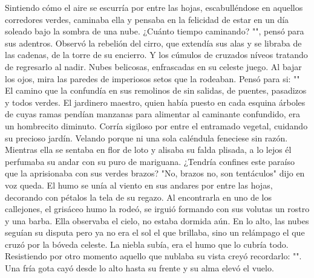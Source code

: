 \markdownRendererInterblockSeparator
{}Sintiendo cómo el aire se escurría por entre las hojas, escabulléndose en aquellos corredores verdes, caminaba ella y pensaba en la felicidad de estar en un día soleado bajo la sombra de una nube. ¿Cuánto tiempo caminando? "", pensó para sus adentros. Observó la rebelión del cirro, que extendía sus alas y se libraba de las cadenas, de la torre de su encierro. Y los cúmulos de cruzados níveos tratando de regresarlo al nadir. Nubes belicosas, enfrascadas en su celeste juego.\markdownRendererInterblockSeparator
{}Al bajar los ojos, mira las paredes de imperiosos setos que la rodeaban. Pensó para si: "" El camino que la confundía en sus remolinos de sin salidas, de puentes, pasadizos y todos verdes. El jardinero maestro, quien había puesto en cada esquina árboles de cuyas ramas pendían manzanas para alimentar al caminante confundido, era un hombrecito diminuto. Corría sigiloso por entre el entramado vegetal, cuidando su precioso jardín. Velando porque ni una sola caléndula feneciese sin razón. Mientras ella se sentaba en flor de loto y alisaba su falda plisada, a lo lejos él perfumaba su andar con su puro de mariguana. ¿Tendría confines este paraíso que la aprisionaba con sus verdes brazos? "No, brazos no, son tentáculos" dijo en voz queda.\markdownRendererInterblockSeparator
{}El humo se unía al viento en sus andares por entre las hojas, decorando con pétalos la tela de su regazo. Al encontrarla en uno de los callejones, el grisáceo humo la rodeó, se irguió formando con sus volutas un rostro y una barba. Ella observaba el cielo, no estaba dormida aún. En lo alto, las nubes seguían su disputa pero ya no era el sol el que brillaba, sino un relámpago el que cruzó por la bóveda celeste. La niebla subía, era el humo que lo cubría todo. Resistiendo por otro momento aquello que nublaba su vista creyó recordarlo: "". Una fría gota cayó desde lo alto hasta su frente y su alma elevó el vuelo.\relax
